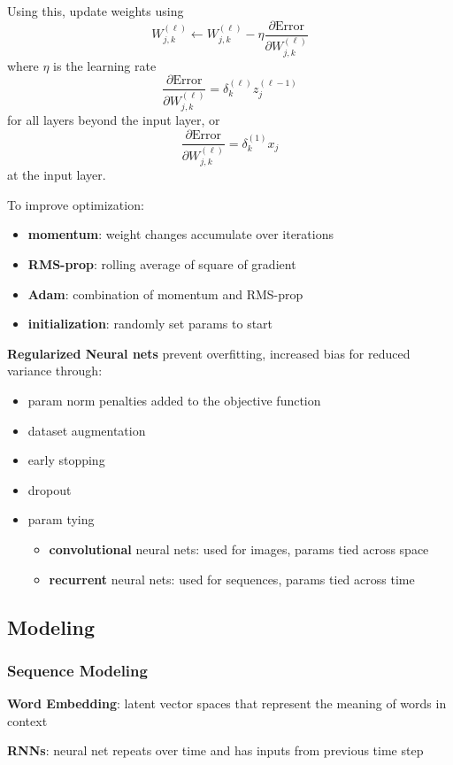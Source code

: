 \documentclass[11pt]{article}
\begin{document}
Using this, update weights using
$$ W_{j, k}^{(\ell)} \gets W_{j, k}^{(\ell)} - \eta \frac{\partial \text{Error}}{\partial W_{j, k}^{(\ell)}} $$
where \(\eta\) is the learning rate
$$ \frac{\partial \text{Error}}{\partial W_{j, k}^{(\ell)}} = \delta_{k}^{(\ell)} z_{j}^{(\ell - 1)} $$
for all layers beyond the input layer, or
$$ \frac{\partial \text{Error}}{\partial W_{j, k}^{(\ell)}} = \delta_{k}^{(1)} x_{j} $$
at the input layer.

To improve optimization:
\begin{itemize}
\item \textbf{momentum}: weight changes accumulate over iterations
\item \textbf{RMS-prop}: rolling average of square of gradient
\item \textbf{Adam}: combination of momentum and RMS-prop
\item \textbf{initialization}: randomly set params to start
\end{itemize}

\textbf{Regularized Neural nets} prevent overfitting, increased bias for reduced variance through:
\begin{itemize}
\item param norm penalties added to the objective function
\item dataset augmentation
\item early stopping
\item dropout
\item param tying
\begin{itemize}
\item \textbf{convolutional} neural nets: used for images, params tied across space
\item \textbf{recurrent} neural nets: used for sequences, params tied across time
\end{itemize}
\end{itemize}
\subsection{Modeling}
\label{sec:org23e0d3e}
\subsubsection{Sequence Modeling}
\label{sec:orgd702438}
\textbf{Word Embedding}: latent vector spaces that represent the meaning of words in context

\textbf{RNNs}: neural net repeats over time and has inputs from previous time step
\end{document}
